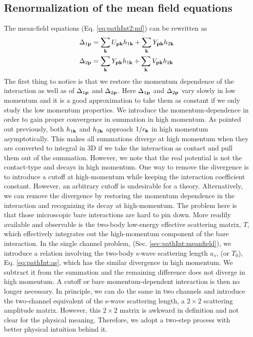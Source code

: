 \subsection {Renormalization of the mean field equations\label{sec:pathInt2:ren}}
The mean-field equations (Eq. \ref{eq:pathInt2:mf}) can be rewritten as 
\begin{align}
\Delta_{1\mathbf{p}}&=\sum_{\mathbf{k}}{}U_{\mathbf{p}\mathbf{k}}h_{1\mathbf{k}}+\sum_{\mathbf{k}}{}Y_{\mathbf{p}\mathbf{k}}h_{2\mathbf{k}}\label{eq:pathInt2:mfopen}\\
\Delta_{2\mathbf{p}}&=\sum_{\mathbf{k}}{}Y_{\mathbf{p}\mathbf{k}}h_{1\mathbf{k}}+\sum_{\mathbf{k}}{}V_{\mathbf{p}\mathbf{k}}h_{2\mathbf{k}}\label{eq:pathInt2:mfclose}
\end{align}
The first thing to notice is that we restore the momentum dependence of the interaction as well as of $\Delta_{1\mathbf{p}}$ and $\Delta_{2\mathbf{p}}$.     Here $\Delta_{1\mathbf{p}}$ and $\Delta_{2\mathbf{p}}$ vary slowly in low momentum and  it is a good approximation to take them as constant if we only study the low momentum properties.  We introduce the momentum-dependence in order to gain proper convergence in summation in high momentum. As pointed out previously, both $h_{1\mathbf{k}}$ and $h_{2\mathbf{k}}$ approach $1/\epsilon_{\mathbf{k}}$ in high momentum asymptotically.  This  makes  all summations diverge at high momentum when they are converted to integral in 3D if we take the interaction as contact and pull them out of the summation.  However, we note that the real potential is not the contact-type and decays in high momentum.  One way to remove the divergence is to  introduce  a cutoff at high-momentum while keeping the interaction coefficient constant.  However, an arbitrary cutoff is  undesirable for a theory.  Alternatively, we can remove the divergence by restoring the momentum dependence in the  interaction and recognizing its decay at high-momentum.    The problem here is that those microscopic bare interactions are hard to pin down.      More readily available and observable is the two-body low-energy effective scattering matrix, $T$, which effectively integrates out the high-momentum component of the bare interaction.             In the single channel problem, (Sec. \ref{sec:pathInt:meanfield}),  we  introduce a relation involving the two-body s-wave scattering length $a_{s}$, (or $T_{0}$), Eq. \eqref{eq:pathInt:as}, which has the similar divergence in high momentum.  We subtract it from the summation and the remaining difference does not diverge in high momentum.  A cutoff or bare momentum-dependent interaction is then no longer necessary.  In principle, we can do the same in two channels and introduce the two-channel equivalent of the s-wave scattering length, a $2\times2$ scattering amplitude matrix.  However, this $2\times2$ matrix is awkward in definition and not clear for the physical meaning.   Therefore, we adopt a two-step process with better physical intuition behind it.   

